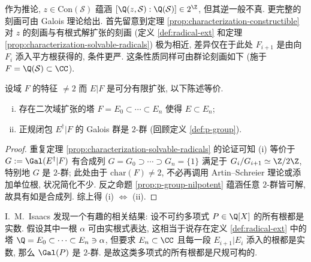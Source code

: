作为推论, $z \in \text{Con}(\mathcal{S})$ 蕴涵 $[\Q(z, \mathcal{S}) : \Q(\mathcal{S})] \in 2^{\Z}$, 但其逆一般不真. 更完整的刻画可由 Galois 理论给出. 首先留意到定理 \ref{prop:characterization-constructible} 对 $z$ 的刻画与有根式解扩张的刻画 (定义 \ref{def:radical-ext} 和定理 \ref{prop:characterization-solvable-radicals}) 极为相近, 差异仅在于此处 $F_{i+1}$ 是由向 $F_i$ 添入平方根获得的, 条件更严. 这条性质同样可由群论刻画如下 (施于 $F = \Q(\mathcal{S}) \subset \CC$).
\begin{theorem}\label{prop:characterization-constructible-2}
	设域 $F$ 的特征 $\neq 2$ 而 $E|F$ 是可分有限扩张, 以下陈述等价.
	\begin{enumerate}[(i)]
		\item 存在二次域扩张的塔 $F = E_0 \subset \cdots \subset E_n$ 使得 $E \subset E_n$;
		\item 正规闭包 $E^\dagger|F$ 的 Galois 群是 $2$-群 (回顾定义 \ref{def:p-group}).
	\end{enumerate}
\end{theorem}
\begin{proof}
	重复定理 \ref{prop:characterization-solvable-radicals} 的论证可知 (i) 等价于 $G := \Gal(E^\dagger|F)$ 有合成列 $G = G_0 \supset \cdots \supset G_n = \{1\}$ 满足于 $G_i/G_{i+1} \simeq \Z/2\Z$, 特别地 $G$ 是 $2$-群; 此处由于 $\text{char}(F) \neq 2$, 不必再调用 Artin--Schreier 理论或添加单位根, 状况简化不少. 反之命题 \ref{prop:p-group-nilpotent} 蕴涵任意 $2$-群皆可解, 故具有如是合成列. 综上得 (i) $\iff$ (ii).
\end{proof}

I.\ M.\ Isaacs \cite{Is85} 发现一个有趣的相关结果: 设不可约多项式 $P \in \Q[X]$ 的所有根都是实数. 假设其中一根 $\alpha$ 可由实根式表达, 这相当于说存在定义 \ref{def:radical-ext} 中的塔 $\Q = E_0 \subset \cdots \subset E_n \ni \alpha$, 但要求 $E_n \subset \CC$ 且每一段 $E_{i+1}|E_i$ 添入的根都是实数, 那么 $\Gal(P)$ 是 $2$-群. 是故这类多项式的所有根都是尺规可构的.

